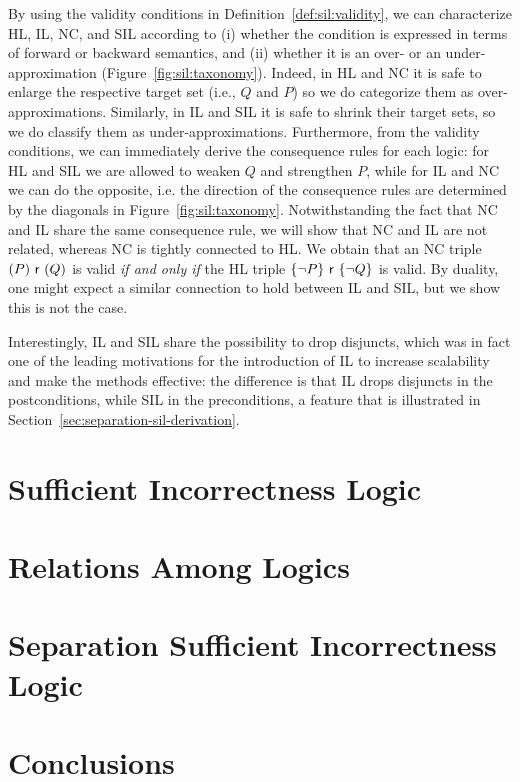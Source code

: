 By using the validity conditions in Definition~\ref{def:sil:validity}, we can characterize HL, IL, NC, and SIL according to (i) whether the condition is expressed in terms of forward or backward semantics, and (ii) whether it is an over- or an under-approximation (Figure~\ref{fig:sil:taxonomy}).
Indeed, in HL and NC it is safe to enlarge the respective target set (i.e., $Q$ and $P$) so we do categorize them as over-approximations.
Similarly, in IL and SIL it is safe to shrink their target sets, so we do classify them as under-approximations.
Furthermore, from the validity conditions, we can immediately derive the consequence rules for each logic: for HL and SIL we are allowed to weaken $Q$ and strengthen $P$, while for IL and NC we can do the opposite, i.e. the direction of the consequence rules are determined by the diagonals in Figure~\ref{fig:sil:taxonomy}.
Notwithstanding the fact that NC and IL share the same consequence rule, we will show that NC and IL are not related, whereas NC is tightly connected to HL.
We obtain that an NC triple $(P)~\mathsf{r}~(Q)$ is valid \emph{if and only if} the HL triple $\{\lnot P\}~\mathsf{r}~\{\lnot Q\}$ is valid.
%
By duality, one might expect a similar connection to hold between IL and SIL, but we show this is not the case.

Interestingly, IL and SIL share the possibility to drop disjuncts, which was in fact one of the leading motivations for the introduction of IL to increase scalability and make the methods effective: the difference is that IL drops disjuncts in the postconditions, while SIL in the preconditions, a feature that is illustrated in Section~\ref{sec:separation-sil-derivation}.


\section{Sufficient Incorrectness Logic}

\section{Relations Among Logics}

\section{Separation Sufficient Incorrectness Logic}

\section{Conclusions}
